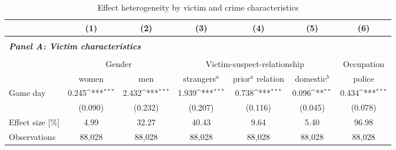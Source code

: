 

\begin{table}[ht] \centering 
	\begin{threeparttable} \centering \caption{Effect heterogeneity by victim and crime characteristics}
		\label{tab_soc_ext:reg_fe_assrate_victim_crime_chars}
		{\def\sym#1{\ifmmode^{#1}\else\(^{#1}\)\fi} 
			\begin{tabular}{l*{6}{c}}
				\toprule 
				&\multicolumn{1}{c}{(1)}&\multicolumn{1}{c}{(2)}&\multicolumn{1}{c}{(3)}&\multicolumn{1}{c}{(4)}&\multicolumn{1}{c}{(5)}&\multicolumn{1}{c}{(6)}\\
				\midrule

				\\
				\multicolumn{6}{l}{\textit{\textbf{Panel A: Victim characteristics}}} \\\\
					& \multicolumn{2}{c}{Gender} & \multicolumn{3}{c}{Victim-suspect-relationship} & Occupation \\
					\cmidrule(lr){2-3} \cmidrule(lr){4-6} \cmidrule(lr){7-7}
				&  women & men & strangers$^a$ & \clb{c}{prior$^a$\\relation} & domestic$^b$ & police \\
				\midrule			
				Game day           		 &     0.245\sym{***}&       2.432\sym{***}&       1.939\sym{***}&       0.738\sym{***}&       0.096\sym{**} &       0.434\sym{***}\\
				                    	 &   (0.090)         &     (0.232)         &     (0.207)         &     (0.116)         &     (0.045)         &     (0.078)         \\
				Effect size [\%]&      4.99         &       32.27         &       40.43         &        9.64         &        5.40         &       96.98         \\
				Observations        	 &    88,028         &      88,028         &      88,028         &      88,028         &      88,028         &      88,028         \\
				

\end{tabular}}
\end{threeparttable}
\end{table}
